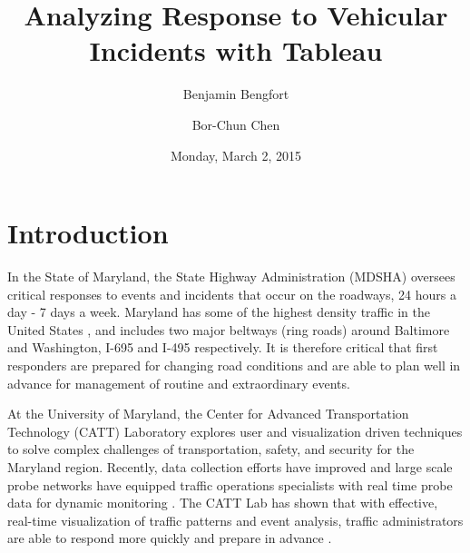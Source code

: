 \documentclass[11pt,letterpaper]{article}
\title{Analyzing Response to Vehicular Incidents with Tableau}
\author[ ]{Benjamin Bengfort}
\author[ ]{Bor-Chun Chen}
\affil[ ]{Department of Computer Science}
\affil[ ]{University of Maryland}
\affil[ ]{\textit{\{bengfort,bcchen\}@cs.umd.edu}}
\date{Monday, March 2, 2015}
\begin{document}




\maketitle

\section*{Introduction}

In the State of Maryland, the State Highway Administration (MDSHA) oversees critical responses to events and incidents that occur on the roadways, 24 hours a day - 7 days a week. Maryland has some of the highest density traffic in the United States \cite{terrigno2014traffic}, and includes two major beltways (ring roads) around Baltimore and Washington, I-695 and I-495 respectively. It is therefore critical that first responders are prepared for changing road conditions and are able to plan well in advance for management of routine and extraordinary events. 

At the  University of Maryland, the Center for Advanced Transportation Technology (CATT) Laboratory explores user and visualization driven techniques to solve complex challenges of transportation, safety, and security for the Maryland region. Recently, data collection efforts have improved and large scale probe networks have equipped traffic operations specialists with real time probe data for dynamic monitoring \cite{lund2010dynamic}. The CATT Lab has shown that with effective, real-time visualization of traffic patterns and event analysis, traffic administrators are able to respond more quickly and prepare in advance \cite{pack2010visualization}.
\end{document}
